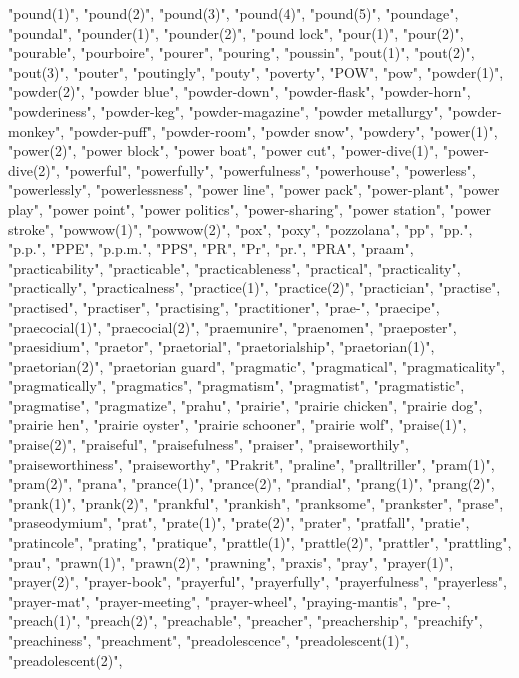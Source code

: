 "pound(1)",
"pound(2)",
"pound(3)",
"pound(4)",
"pound(5)",
"poundage",
"poundal",
"pounder(1)",
"pounder(2)",
"pound lock",
"pour(1)",
"pour(2)",
"pourable",
"pourboire",
"pourer",
"pouring",
"poussin",
"pout(1)",
"pout(2)",
"pout(3)",
"pouter",
"poutingly",
"pouty",
"poverty",
"POW",
"pow",
"powder(1)",
"powder(2)",
"powder blue",
"powder-down",
"powder-flask",
"powder-horn",
"powderiness",
"powder-keg",
"powder-magazine",
"powder metallurgy",
"powder-monkey",
"powder-puff",
"powder-room",
"powder snow",
"powdery",
"power(1)",
"power(2)",
"power block",
"power boat",
"power cut",
"power-dive(1)",
"power-dive(2)",
"powerful",
"powerfully",
"powerfulness",
"powerhouse",
"powerless",
"powerlessly",
"powerlessness",
"power line",
"power pack",
"power-plant",
"power play",
"power point",
"power politics",
"power-sharing",
"power station",
"power stroke",
"powwow(1)",
"powwow(2)",
"pox",
"poxy",
"pozzolana",
"pp",
"pp.",
"p.p.",
"PPE",
"p.p.m.",
"PPS",
"PR",
"Pr",
"pr.",
"PRA",
"praam",
"practicability",
"practicable",
"practicableness",
"practical",
"practicality",
"practically",
"practicalness",
"practice(1)",
"practice(2)",
"practician",
"practise",
"practised",
"practiser",
"practising",
"practitioner",
"prae-",
"praecipe",
"praecocial(1)",
"praecocial(2)",
"praemunire",
"praenomen",
"praeposter",
"praesidium",
"praetor",
"praetorial",
"praetorialship",
"praetorian(1)",
"praetorian(2)",
"praetorian guard",
"pragmatic",
"pragmatical",
"pragmaticality",
"pragmatically",
"pragmatics",
"pragmatism",
"pragmatist",
"pragmatistic",
"pragmatise",
"pragmatize",
"prahu",
"prairie",
"prairie chicken",
"prairie dog",
"prairie hen",
"prairie oyster",
"prairie schooner",
"prairie wolf",
"praise(1)",
"praise(2)",
"praiseful",
"praisefulness",
"praiser",
"praiseworthily",
"praiseworthiness",
"praiseworthy",
"Prakrit",
"praline",
"pralltriller",
"pram(1)",
"pram(2)",
"prana",
"prance(1)",
"prance(2)",
"prandial",
"prang(1)",
"prang(2)",
"prank(1)",
"prank(2)",
"prankful",
"prankish",
"pranksome",
"prankster",
"prase",
"praseodymium",
"prat",
"prate(1)",
"prate(2)",
"prater",
"pratfall",
"pratie",
"pratincole",
"prating",
"pratique",
"prattle(1)",
"prattle(2)",
"prattler",
"prattling",
"prau",
"prawn(1)",
"prawn(2)",
"prawning",
"praxis",
"pray",
"prayer(1)",
"prayer(2)",
"prayer-book",
"prayerful",
"prayerfully",
"prayerfulness",
"prayerless",
"prayer-mat",
"prayer-meeting",
"prayer-wheel",
"praying-mantis",
"pre-",
"preach(1)",
"preach(2)",
"preachable",
"preacher",
"preachership",
"preachify",
"preachiness",
"preachment",
"preadolescence",
"preadolescent(1)",
"preadolescent(2)",

